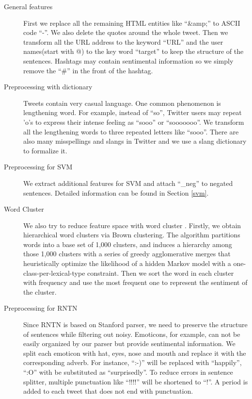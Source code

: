 \begin{description}
\item[General features] First we replace all the remaining HTML entities like ``\&amp;'' to ASCII code ``-''. We also delete the quotes around the whole tweet. Then we transform all the URL address to the keyword ``URL'' and the user names(start with @) to the key word ``target'' to keep the structure of the sentences. Hashtags may contain sentimental information so we simply remove the ``\#'' in the front of the hashtag.
\item[Preprocessing with dictionary] Tweets contain very casual language. One common phenomenon is lengthening word. For example, instead of ``so'', Twitter users may repeat 'o's to express their intense feeling as ``sooo'' or ``sooooooo''. We transform all the lengthening words to three repeated letters like ``sooo''. There are also many misspellings and slangs in Twitter and we use a slang dictionary to formalize it.
\item[Preprocessing for SVM] We extract additional features for SVM and attach ``\_neg'' to negated sentences. Detailed information can be found in Section \ref{svm}.  %

\item[Word Cluster] We also try to reduce feature space with word cluster \cite{Owoputi:2013}. Firstly, we obtain hierarchical word clusters via Brown clustering. The algorithm partitions words into a base set of 1,000 clusters, and induces a hierarchy among those 1,000 clusters with a series of greedy agglomerative merges that heuristically optimize the likelihood of a hidden Markov model with a one-class-per-lexical-type constraint. Then we sort the word in each cluster with frequency and use the most frequent one to represent the sentiment of the cluster.


\item[Preprocessing for RNTN] Since RNTN is based on Stanford parser, we need to preserve the structure of sentences while filtering out noisy. 
 Emoticons, for example, can not be easily organized by our parser but provide sentimental information. We split each emoticon with hat, eyes, nose and mouth and replace it with the corresponding adverb. For instance, ``:-)'' will be replaced with ``happily'', ``:O'' with be substituted as ``surprisedly''.  To reduce errors in sentence splitter, multiple punctuation like ``!!!!'' will be shortened to ``!''.  A period is added to each tweet that does not end with punctuation.

\end{description}


